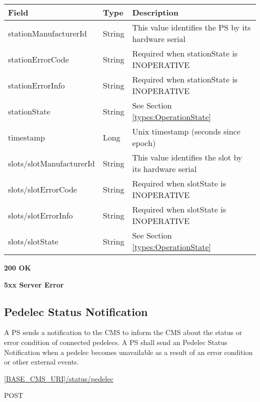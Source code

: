 \begin{table}[!h]
\vspace{-7mm}
\begin{tabularx}{\linewidth}{ | l  | l | X | }
  \hline
  \rowcolor{table-head}
  Field & Type & Description \\
  \hline
  stationManufacturerId & String 		& This value identifies the \acs{PS} by its hardware serial\\
  stationErrorCode & String & Required when stationState is INOPERATIVE \\
  stationErrorInfo & String & Required when stationState is INOPERATIVE \\
  stationState & String & See Section \ref{types:OperationState} \\
  timestamp & Long & Unix timestamp (seconds since epoch) \\
  slots/slotManufacturerId & String 	& This value identifies the slot by its hardware serial \\
  slots/slotErrorCode & String & Required when slotState is INOPERATIVE \\
  slots/slotErrorInfo & String & Required when slotState is INOPERATIVE \\
  slots/slotState & String & See Section \ref{types:OperationState} \\
  \hline
\end{tabularx}
\end{table}

 \textbf{200 OK}

 \textbf{5xx Server Error}

\subsection{Pedelec Status Notification}

A \acs{PS} sends a notification to the \acs{CMS} to inform the \acs{CMS} about the status or error condition of connected pedelecs. A \acs{PS} shall send an Pedelec Status Notification when a pedelec becomes unavailable as a result of an error condition or other external events.

 \url{[BASE_CMS_URI]/status/pedelec}

 POST

